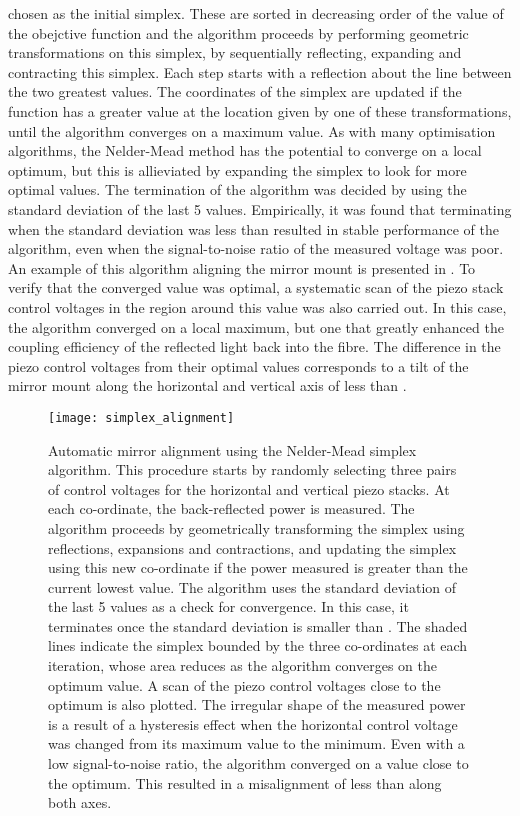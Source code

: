 chosen as the initial simplex. These are sorted in decreasing order of the value
of the obejctive function and the algorithm proceeds by performing geometric
transformations on this simplex, by sequentially reflecting, expanding and
contracting this simplex. Each step starts with a reflection about the line
between the two greatest values. The coordinates of the simplex are updated if
the function has a greater value at the location given by one of these
transformations, until the algorithm converges on a maximum value. As with many
optimisation algorithms, the Nelder-Mead method has the potential to converge on
a local optimum, but this is allieviated by expanding the simplex to look for
more optimal values. The termination of the algorithm was decided by using the
standard deviation of the last 5 values. Empirically, it was found that
terminating when the standard deviation was less than 
resulted in stable performance of the algorithm, even when the signal-to-noise
ratio of the measured voltage was poor. An example of this algorithm aligning
the mirror mount is presented in . To verify
that the converged value was optimal, a systematic scan of the piezo stack
control voltages in the region around this value was also carried out. In this
case, the algorithm converged on a local maximum, but one that greatly enhanced
the coupling efficiency of the reflected light back into the fibre. The
difference in the piezo control voltages from their optimal values corresponds
to a tilt of the mirror mount along the horizontal and vertical axis of less
than .  \begin{figure}[!htbp] \centering
	\texttt{[image: simplex\_alignment]}
	\caption[Automatic mirror alignment using the Nelder-Mead simplex
		algorithm.]{Automatic mirror alignment using the Nelder-Mead simplex
		algorithm. This procedure starts by randomly selecting three pairs of
		control voltages for the horizontal and vertical piezo stacks. At each
		co-ordinate, the back-reflected power is measured. The algorithm proceeds by
		geometrically transforming the simplex using reflections, expansions and
		contractions, and updating the simplex using this new co-ordinate if the
		power measured is greater than the current lowest value. The algorithm uses
		the standard deviation of the last 5 values as a check for convergence. In
		this case, it terminates once the standard deviation is smaller than
		. The shaded lines indicate the simplex bounded by
		the three co-ordinates at each iteration, whose area reduces as the
		algorithm converges on the optimum value. A scan of the piezo control
		voltages close to the optimum is also plotted. The irregular shape of the
		measured power is a result of a hysteresis effect when the horizontal
		control voltage was changed from its maximum value to the minimum. Even with
		a low signal-to-noise ratio, the algorithm converged on a value close to the
		optimum. This resulted in a misalignment of less than
		 along both axes.}
		\label{fig:simplex_optimisation} \end{figure}
